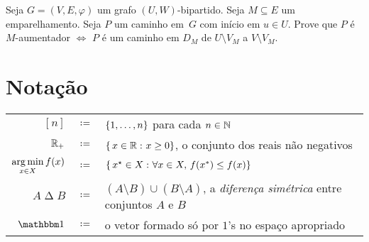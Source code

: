 \documentclass[10pt,reqno]{amsart}
\begin{document}
\begin{exercise}
  Seja \(G = (V,E,\varphi)\) um grafo \((U,W)\)-bipartido.  Seja
  \(M \subseteq E\) um emparelhamento.  Seja \(P\) um caminho em~\(G\)
  com início em \(u \in U\).  Prove que \(P\) é \(M\)-aumentador
  \(\iff\) \(P\) é um caminho em \(D_M\) de \(U \setminus V_M\) a
  \(V \setminus V_M\).
\end{exercise}


\appendix

\section{Notação}

\bgroup
\renewcommand{\arraystretch}{1.2}
\begin{table}[!ht]
  \centering
  \begin{tabular}{r c p{12cm} }
    \toprule
    \([n]\)
    & \(\coloneqq\) &
    \(\{1,\dotsc,n\}\) para cada \(n \in \mathbb{N}\)
    \\
    \(\mathbb{R}_+\)
    & \(\coloneqq\) &
    \(\{\,{x \in \mathbb{R}}\,\colon{x \geq 0}\}\), o conjunto dos reais não negativos
    \\
    \(\displaystyle\operatorname*{arg\,min}_{x \in X} f(x)\)
    & \(\coloneqq\) &
    \(\{\,{x^{\star} \in X}\,\colon{\forall x \in X,\,f(x^*) \leq f(x)}\}\)
    \\
    \(A \mathbin{\Delta} B\)
    & \(\coloneqq\) &
    \((A \setminus B) \cup (B \setminus A)\),
    a \emph{diferença simétrica} entre conjuntos \(A\) e \(B\)
    \\
    \(\ones\)
    & \(\coloneqq\) &
    o vetor formado só por \(1\)'s no espaço apropriado
    \\
    \bottomrule
  \end{tabular}
  \label{tbl:special-sets}
\end{table}
\egroup                         %

\nocite{CookCPS98a,Schrijver03a}

\begingroup
\printbibliography
\endgroup
\end{document}
